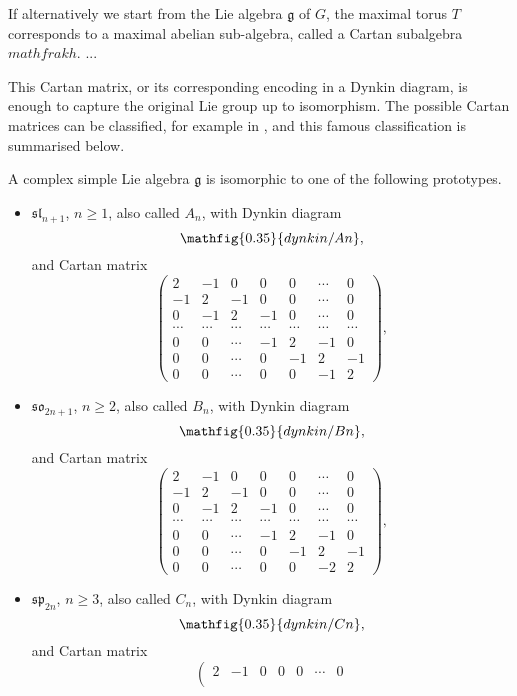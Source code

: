If alternatively we start from the Lie algebra $\mathfrak{g}$ of $G$, the maximal torus $T$ corresponds to a maximal abelian sub-algebra, called a Cartan
subalgebra $mathfrak{h}$. ...

This Cartan matrix, or its corresponding encoding in a Dynkin diagram, is enough to capture the original Lie group up to isomorphism. The possible
Cartan matrices can be classified, for example in \cite{humphreys}, and this famous classification is summarised below.

A complex simple Lie algebra
$\mathfrak{g}$ is isomorphic to one of the following prototypes.
\begin{itemize}
\item $\mathfrak{sl}_{n+1}$, $n \geq 1$, also called $A_n$, with Dynkin diagram
$$\mathfig{0.35}{dynkin/An},$$ and Cartan matrix $$\left(
\begin{array}{rrrrrrr}
 2 & -1 & 0 & 0 & 0 &\cdots & 0 \\
 -1 & 2 & -1 & 0 & 0 &\cdots & 0 \\
 0 & -1 & 2 & -1 & 0 & \cdots & 0 \\
 \cdots & \cdots & \cdots & \cdots & \cdots & \cdots & \cdots \\
 0 & 0& \cdots & -1 & 2 & -1 & 0 \\
 0 & 0 &\cdots & 0 & -1 & 2 & -1 \\
 0 & 0 &\cdots & 0 & 0 & -1 & 2
\end{array}
\right),$$
\item $\mathfrak{so}_{2n+1}$, $n \geq 2$, also called $B_n$, with Dynkin diagram
$$\mathfig{0.35}{dynkin/Bn},$$ and Cartan matrix
$$\left(
\begin{array}{rrrrrrr}
 2 & -1 & 0 & 0 & 0 & \cdots & 0 \\
 -1 & 2 & -1 & 0 & 0 & \cdots & 0 \\
 0 & -1 & 2 & -1 & 0 & \cdots &0 \\
 \cdots & \cdots & \cdots & \cdots & \cdots & \cdots & \cdots \\
 0 & 0 &\cdots & -1 & 2 & -1 & 0 \\
 0 & 0 &\cdots & 0 & -1 & 2 & -1 \\
 0 & 0 &\cdots & 0 & 0 & -2 & 2
\end{array}
\right),$$
\item $\mathfrak{sp}_{2n}$, $n \geq 3$, also called $C_n$, with Dynkin diagram
$$\mathfig{0.35}{dynkin/Cn},$$ and Cartan matrix $$\left(
\begin{array}{rrrrrrr}
 2 & -1 & 0 & 0 & 0 & \cdots & 0 \\

\end{array}$$
\end{itemize}

